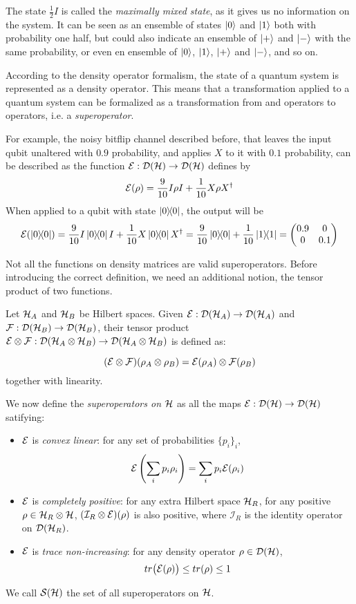 The state $\frac{1}{2}I$ is called the \textit{maximally mixed state}, as it gives us no information on the system. It can be seen as an ensemble of states $\ket{0}$ and $\ket{1}$ both with probability one half, but could also indicate an ensemble of $\ket{+}$ and $\ket{-}$ with the same probability, or even en ensemble of $\ket{0}$, $\ket{1}$, $\ket{+}$ and $\ket{-}$, and so on. 


According to the density operator formalism, the state of a quantum system is represented as a density operator. This means that a transformation applied to a quantum system can be formalized as a transformation from and operators to operators, i.e. a \textit{superoperator}.

For example, the noisy bitflip channel described before, that leaves the input qubit unaltered with $0.9$ probability, and applies $X$ to it with $0.1$ probability, can be described as the function $\mathcal{E}: \mathcal{D}(\mathcal{H}) \rightarrow \mathcal{D}(\mathcal{H})$ defines by
\[\mathcal{E}(\rho) = \frac{9}{10} 
I\rho I
+
\frac{1}{10}
X \rho X^\dagger
\]
When applied to a qubit with state $\ket{0}\!\!\bra{0}$, the output will be 
\[\sop(\proj{0}) = \frac{9}{10} I \proj{0} I + \frac{1}{10}X \proj{0} X^\dagger = \frac{9}{10} \proj{0} + \frac{1}{10}\proj{1} = 
\begin{pmatrix} 0.9 & 0 \\ 0 & 0.1 \end{pmatrix} \]

Not all the functions on density matrices are valid superoperators. Before introducing the correct definition, we need an additional notion, the tensor product of two functions.


Let $\mathcal{H}_A$ and $\mathcal{H}_B$ be Hilbert spaces. Given $\mathcal{E}: \mathcal{D}(\mathcal{H}_A) \rightarrow \mathcal{D}(\mathcal{H}_A)$ and $\mathcal{F}: \mathcal{D}(\mathcal{H}_B) \rightarrow \mathcal{D}(\mathcal{H}_B)$,  their tensor product $\mathcal{E}\otimes \mathcal{F}: \mathcal{D}(\mathcal{H}_A \otimes \mathcal{H}_B)\rightarrow \mathcal{D}(\mathcal{H}_A \otimes \mathcal{H}_B)$ is defined as:

\[
	(\mathcal{E} \otimes \mathcal{F})(\rho_A \otimes \rho_B) = \mathcal{E}(\rho_A)\otimes \mathcal{F}(\rho_B)
\]
together with linearity.


We now define the \textit{superoperators on $\mathcal{H}$} as all the maps $\mathcal{E}: \mathcal{D}(\mathcal{H}) \rightarrow \mathcal{D}(\mathcal{H})$ satifying:
\begin{itemize}
\item $\mathcal{E}$ is \textit{convex linear}: for any set of probabilities	$\{p_i\}_i$,
\[\mathcal{E}\left(\sum_i p_i \rho_i \right) = \sum_i p_i \mathcal{E}(\rho_i)\]
\item $\mathcal{E}$ is \textit{completely positive}: for any extra Hilbert space $\mathcal{H}_R$, for any positive $\rho \in \mathcal{H}_R \otimes \mathcal{H}$, $(\mathcal{I}_R\otimes \mathcal{E})(\rho)$ is also positive, where $\mathcal{I}_R$ is the identity operator on $\mathcal{D}(\mathcal{H}_R)$.
\item $\mathcal{E}$ is \textit{trace non-increasing}: for any density operator $\rho \in \mathcal{D}(\mathcal{H})$, 
\[tr\big(\mathcal{E}(\rho)\big) \leq tr(\rho) \leq 1\]
\end{itemize}
We call $\mathcal{S}(\mathcal{H})$ the set of all superoperators on $\mathcal{H}$.


